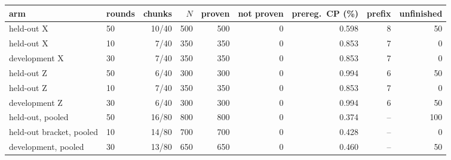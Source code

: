 \begin{tabular}{@{}llrrrrrrr@{}}
\toprule
arm & rounds & chunks & $N$ & proven & not proven & prereg.\ CP (\%) & prefix & unfinished \\
\midrule
held-out X & 50 & 10/40 & 500 & 500 & 0 & 0.598 & 8 & 50 \\
held-out X & 10 & 7/40 & 350 & 350 & 0 & 0.853 & 7 & 0 \\
development X & 30 & 7/40 & 350 & 350 & 0 & 0.853 & 7 & 0 \\
held-out Z & 50 & 6/40 & 300 & 300 & 0 & 0.994 & 6 & 50 \\
held-out Z & 10 & 7/40 & 350 & 350 & 0 & 0.853 & 7 & 0 \\
development Z & 30 & 6/40 & 300 & 300 & 0 & 0.994 & 6 & 50 \\
\midrule
held-out, pooled & 50 & 16/80 & 800 & 800 & 0 & 0.374 & -- & 100 \\
held-out bracket, pooled & 10 & 14/80 & 700 & 700 & 0 & 0.428 & -- & 0 \\
development, pooled & 30 & 13/80 & 650 & 650 & 0 & 0.460 & -- & 50 \\
\bottomrule
\end{tabular}
